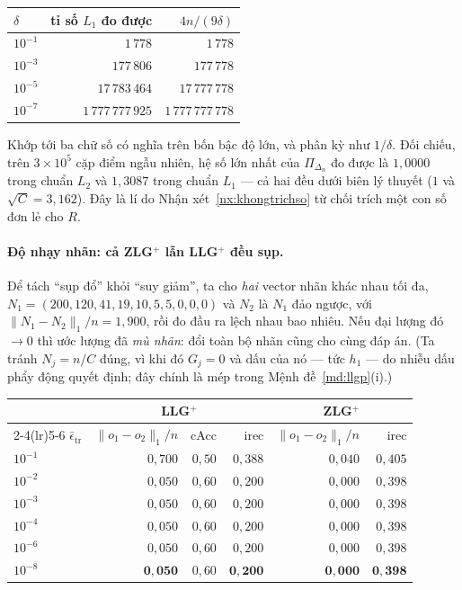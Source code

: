 \documentclass[11pt]{article}
\theoremstyle{remark}
\newcommand{\simplex}{\Delta_n}
\begin{document}
\begin{center}
\footnotesize
\begin{tabular}{@{}lrr@{}}
\toprule
$\delta$ & tỉ số $L_1$ đo được & $4n/(9\delta)$ \\
\midrule
$10^{-1}$ & $1\,778$ & $1\,778$ \\
$10^{-3}$ & $177\,806$ & $177\,778$ \\
$10^{-5}$ & $17\,783\,464$ & $17\,777\,778$ \\
$10^{-7}$ & $1\,777\,777\,925$ & $1\,777\,777\,778$ \\
\bottomrule
\end{tabular}
\end{center}

Khớp tới ba chữ số có nghĩa trên bốn bậc độ lớn, và phân kỳ như $1/\delta$.
Đối chiếu, trên $3\times10^5$ cặp điểm ngẫu nhiên, hệ số lớn nhất của
$\Pi_{\simplex}$ đo được là $1{,}0000$ trong chuẩn $L_2$ và $1{,}3087$ trong
chuẩn $L_1$ --- cả hai đều dưới biên lý thuyết ($1$ và $\sqrt{C}=3{,}162$).
Đây là lí do Nhận xét~\ref{nx:khongtrichso} từ chối trích một con số đơn lẻ
cho $R$.

\paragraph{Độ nhạy nhãn: cả ZLG$^+$ lẫn LLG$^+$ đều sụp.}
Để tách ``sụp đổ'' khỏi ``suy giảm'', ta cho \emph{hai} vector nhãn khác nhau
tối đa, $N_1=(200,120,41,19,10,5,5,0,0,0)$ và $N_2$ là $N_1$ đảo ngược, với
$\|N_1-N_2\|_1/n = 1{,}900$, rồi đo đầu ra lệch nhau bao nhiêu. Nếu đại lượng
đó $\to 0$ thì ước lượng đã \emph{mù nhãn}: đổi toàn bộ nhãn cũng cho cùng
đáp án. (Ta tránh $N_j = n/C$ đúng, vì khi đó $G_j = 0$ và dấu của nó --- tức
$h_1$ --- do nhiễu dấu phẩy động quyết định; đây chính là mép trong
Mệnh đề~\ref{md:llgp}(i).)

\begin{center}
\footnotesize
\begin{tabular}{@{}lrrrrr@{}}
\toprule
& \multicolumn{3}{c}{LLG$^+$} & \multicolumn{2}{c}{ZLG$^+$} \\
\cmidrule(lr){2-4}\cmidrule(lr){5-6}
$\bar\epsilon_{\mathrm{tr}}$ & $\|o_1-o_2\|_1/n$ & cAcc & irec
 & $\|o_1-o_2\|_1/n$ & irec \\
\midrule
$10^{-1}$ & $0{,}700$ & $0{,}50$ & $0{,}388$ & $0{,}040$ & $0{,}405$ \\
$10^{-2}$ & $0{,}050$ & $0{,}60$ & $0{,}200$ & $0{,}000$ & $0{,}398$ \\
$10^{-3}$ & $0{,}050$ & $0{,}60$ & $0{,}200$ & $0{,}000$ & $0{,}398$ \\
$10^{-4}$ & $0{,}050$ & $0{,}60$ & $0{,}200$ & $0{,}000$ & $0{,}398$ \\
$10^{-6}$ & $0{,}050$ & $0{,}60$ & $0{,}200$ & $0{,}000$ & $0{,}398$ \\
$10^{-8}$ & $\mathbf{0{,}050}$ & $0{,}60$ & $\mathbf{0{,}200}$ & $\mathbf{0{,}000}$ & $\mathbf{0{,}398}$ \\
\bottomrule
\end{tabular}
\end{center}
\end{document}
